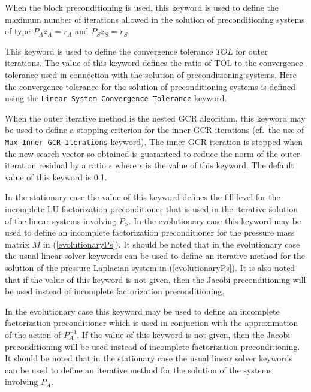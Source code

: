 When the block preconditioning is used, this keyword is used to define
the maximum number of iterations allowed in the solution of
preconditioning systems of type $P_Az_A=r_A$ and $P_Sz_S=r_S$.

This keyword is used to define the convergence tolerance $TOL$ for 
outer iterations. The value of this keyword defines the ratio of   
TOL to the convergence tolerance used in connection with the solution of 
preconditioning systems. Here the convergence tolerance for 
the solution of preconditioning systems is defined
using the {\tt Linear System Convergence Tolerance} keyword. 

When the outer iterative method is the nested GCR algorithm,
this keyword may be used to define a stopping criterion 
for the inner GCR iterations (cf.\ the use of 
{\tt Max Inner GCR Iterations} keyword).
The inner GCR iteration is stopped when the new search vector so obtained
is guaranteed to
reduce the norm of the outer iteration residual by a ratio $\epsilon$ where
$\epsilon$ is the value of this keyword.
The default value of this keyword is 0.1.


In the stationary case the value of this keyword defines 
the fill level for the incomplete LU factorization preconditioner that 
is used in the iterative solution of the linear systems   
involving $P_S$. In the evolutionary case this keyword may be used to
define an incomplete factorization preconditioner for the pressure mass 
matrix $M$ in (\ref{evolutionaryPs}). It should be noted that
in the evolutionary case the usual linear
solver keywords can be used to define an iterative method for the solution of
the pressure Laplacian system in (\ref{evolutionaryPs}). 
It is also noted that if 
the value of this keyword is not given, then
the Jacobi preconditioning will be used instead of incomplete 
factorization preconditioning.

In the evolutionary case this keyword may be used to
define an incomplete factorization preconditioner which is 
used in conjuction with the approximation of the action of $P_A^{-1}$.
If the value of this keyword is not given, then
the Jacobi preconditioning will be used instead of incomplete 
factorization preconditioning.
It should be noted that
in the stationary case the usual linear
solver keywords can be used to define an iterative method for the solution of
the systems involving $P_A$.



